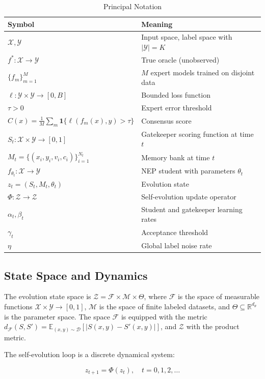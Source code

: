 \documentclass[11pt,a4paper]{article}
\theoremstyle{plain}
\theoremstyle{definition}
\theoremstyle{remark}
\newcommand{\R}{\mathbb{R}}
\newcommand{\E}{\mathbb{E}}
\newcommand{\F}{\mathcal{F}}
\newcommand{\X}{\mathcal{X}}
\newcommand{\Y}{\mathcal{Y}}
\newcommand{\Z}{\mathcal{Z}}
\newcommand{\M}{\mathcal{M}}
\newcommand{\D}{\mathcal{D}}
\newcommand{\ind}[1]{\mathbf{1}\{#1\}}
\begin{document}
\begin{table}[ht]
\centering
\caption{Principal Notation}
\label{tab:notation}
\begin{tabular}{@{}ll@{}}
\toprule
Symbol & Meaning \\
\midrule
$\X, \Y$ & Input space, label space with $|\Y| = K$ \\
$f^*: \X \to \Y$ & True oracle (unobserved) \\
$\{f_m\}_{m=1}^M$ & $M$ expert models trained on disjoint data \\
$\ell: \Y \times \Y \to [0, B]$ & Bounded loss function \\
$\tau > 0$ & Expert error threshold \\
$C(x) = \frac{1}{M}\sum_m \ind{\ell(f_m(x), y) > \tau}$ & Consensus score \\
$S_t: \X \times \Y \to [0,1]$ & Gatekeeper scoring function at time $t$ \\
$M_t = \{(x_i, y_i, v_i, c_i)\}_{i=1}^{N_t}$ & Memory bank at time $t$ \\
$f_{\theta_t}: \X \to \Y$ & NEP student with parameters $\theta_t$ \\
$z_t = (S_t, M_t, \theta_t)$ & Evolution state \\
$\Phi: \Z \to \Z$ & Self-evolution update operator \\
$\alpha_t, \beta_t$ & Student and gatekeeper learning rates \\
$\gamma_t$ & Acceptance threshold \\
$\eta$ & Global label noise rate \\
\bottomrule
\end{tabular}
\end{table}

\subsection{State Space and Dynamics}

The evolution state space is $\Z = \F \times \M \times \Theta$, where $\F$ is the space of measurable functions $\X \times \Y \to [0,1]$, $\M$ is the space of finite labeled datasets, and $\Theta \subseteq \R^{d_\theta}$ is the parameter space. The space $\F$ is equipped with the metric $d_{\F}(S, S') = \E_{(x,y) \sim \D}[|S(x,y) - S'(x,y)|]$, and $\Z$ with the product metric.

The self-evolution loop is a discrete dynamical system:

\begin{equation}\label{eq:dynamics}
    z_{t+1} = \Phi(z_t), \quad t = 0, 1, 2, \dots
\end{equation}
\end{document}
